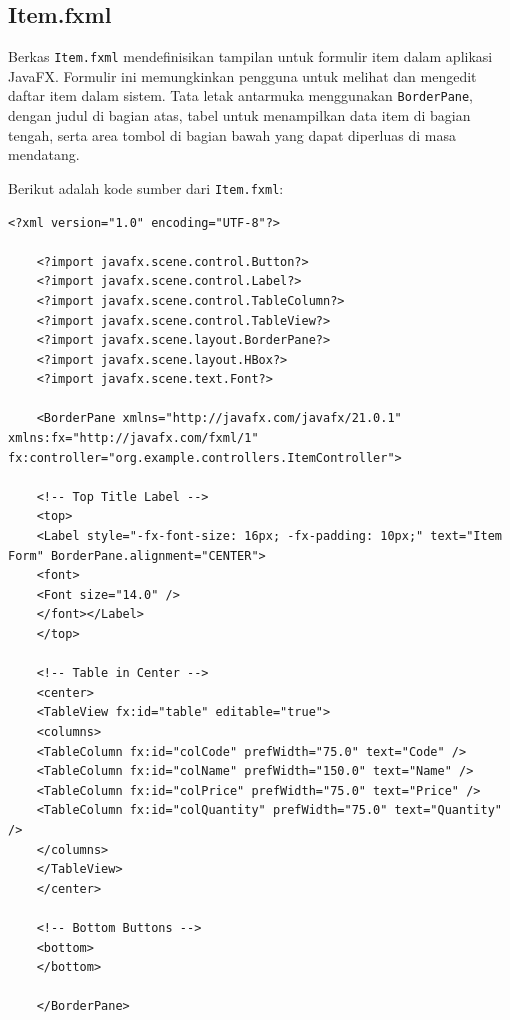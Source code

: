 \subsection{Item.fxml}

Berkas \texttt{Item.fxml} mendefinisikan tampilan untuk formulir item dalam aplikasi JavaFX. Formulir ini memungkinkan pengguna untuk melihat dan mengedit daftar item dalam sistem. Tata letak antarmuka menggunakan \texttt{BorderPane}, dengan judul di bagian atas, tabel untuk menampilkan data item di bagian tengah, serta area tombol di bagian bawah yang dapat diperluas di masa mendatang.

Berikut adalah kode sumber dari \texttt{Item.fxml}:

\begin{lstlisting}[style=XmlStyle]
	<?xml version="1.0" encoding="UTF-8"?>
	
	<?import javafx.scene.control.Button?>
	<?import javafx.scene.control.Label?>
	<?import javafx.scene.control.TableColumn?>
	<?import javafx.scene.control.TableView?>
	<?import javafx.scene.layout.BorderPane?>
	<?import javafx.scene.layout.HBox?>
	<?import javafx.scene.text.Font?>
	
	<BorderPane xmlns="http://javafx.com/javafx/21.0.1" xmlns:fx="http://javafx.com/fxml/1" fx:controller="org.example.controllers.ItemController">
	
	<!-- Top Title Label -->
	<top>
	<Label style="-fx-font-size: 16px; -fx-padding: 10px;" text="Item Form" BorderPane.alignment="CENTER">
	<font>
	<Font size="14.0" />
	</font></Label>
	</top>
	
	<!-- Table in Center -->
	<center>
	<TableView fx:id="table" editable="true">
	<columns>
	<TableColumn fx:id="colCode" prefWidth="75.0" text="Code" />
	<TableColumn fx:id="colName" prefWidth="150.0" text="Name" />
	<TableColumn fx:id="colPrice" prefWidth="75.0" text="Price" />
	<TableColumn fx:id="colQuantity" prefWidth="75.0" text="Quantity" />
	</columns>
	</TableView>
	</center>
	
	<!-- Bottom Buttons -->
	<bottom>
	</bottom>
	
	</BorderPane>
\end{lstlisting}

